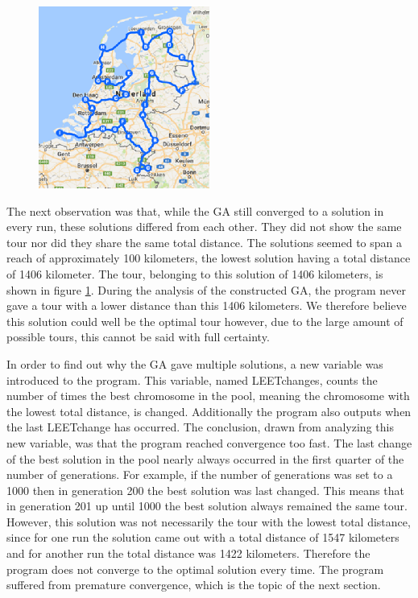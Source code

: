 \begin{figure}
	\vspace{-1cm}
	\begin{center}
		\includegraphics[width=0.5\textwidth]{1406tour}
	\end{center}	
	\label{1406tour}
\end{figure}

The next observation was that, while the GA still converged to a solution in every run, these solutions differed from each other. They did not show the same tour nor did they share the same total distance. The solutions seemed to span a reach of approximately 100 kilometers, the lowest solution having a total distance of 1406 kilometer. The tour, belonging to this solution of 1406 kilometers, is shown in figure \ref{1406tour}. During the analysis of the constructed GA, the program never gave a tour with a lower distance than this 1406 kilometers. We therefore believe this solution could well be the optimal tour however, due to the large amount of possible tours, this cannot be said with full certainty. 

\par
In order to find out why the GA gave multiple solutions, a new variable was introduced to the program. This variable, named LEETchanges, counts the number of times the best chromosome in the pool, meaning the chromosome with the lowest total distance, is changed. Additionally the program also outputs when the last LEETchange has occurred. The conclusion, drawn from analyzing this new variable, was that the program reached convergence too fast. The last change of the best solution in the pool nearly always occurred in the first quarter of the number of generations. For example, if the number of generations was set to a 1000 then in generation 200 the best solution was last changed. This means that in generation 201 up until 1000 the best solution always remained the same tour. However, this solution was not necessarily the tour with the lowest total distance, since for one run the solution came out with a total distance of 1547 kilometers and for another run the total distance was 1422 kilometers. Therefore the program does not converge to the optimal solution every time. The program suffered from premature convergence, which is the topic of the next section. 

